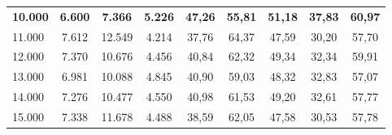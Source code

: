 \begin{table}[ht!]
\begin{tabular}{lcccccccc}
\textbf{10.000}     & \textbf{6.600} & \textbf{7.366} & \textbf{5.226} & \textbf{47,26}                                                    & \textbf{55,81}                                                 & \textbf{51,18}                                                  & \textbf{37,83}                                                      & \textbf{60,97}                                                    \\
11.000              & 7.612          & 12.549         & 4.214          & 37,76                                                             & 64,37                                                          & 47,59                                                           & 30,20                                                               & 57,70                                                             \\
12.000              & 7.370          & 10.676         & 4.456          & 40,84                                                             & 62,32                                                          & 49,34                                                           & 32,34                                                               & 59,91                                                             \\
13.000              & 6.981          & 10.088         & 4.845          & 40,90                                                             & 59,03                                                          & 48,32                                                           & 32,83                                                               & 57,07                                                             \\
14.000              & 7.276          & 10.477         & 4.550          & 40,98                                                             & 61,53                                                          & 49,20                                                           & 32,61                                                               & 57,77                                                             \\
15.000              & 7.338          & 11.678         & 4.488          & 38,59                                                             & 62,05                                                          & 47,58                                                           & 30,53                                                               & 57,78                                                             \\

\end{tabular}
\end{table}
